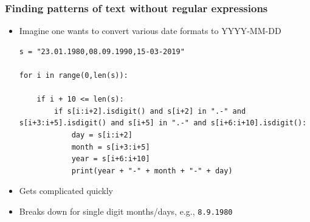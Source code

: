 \documentclass[xcolor=table]{beamer}
\begin{document}
\begin{frame}[fragile]
\frametitle{Finding patterns of text without regular expressions}
    \begin{itemize}
        \item Imagine one wants to convert various date formats to YYYY-MM-DD
\begin{lstlisting}[style=python]
s = "23.01.1980,08.09.1990,15-03-2019"

for i in range(0,len(s)):

    if i + 10 <= len(s):
        if s[i:i+2].isdigit() and s[i+2] in ".-" and s[i+3:i+5].isdigit() and s[i+5] in ".-" and s[i+6:i+10].isdigit():
            day = s[i:i+2]
            month = s[i+3:i+5]
            year = s[i+6:i+10]
            print(year + "-" + month + "-" + day)
\end{lstlisting}
\item Gets complicated quickly 
\item Breaks down for single digit months/days, e.g., \texttt{8.9.1980}
    \end{itemize}
\end{frame}
\end{document}
